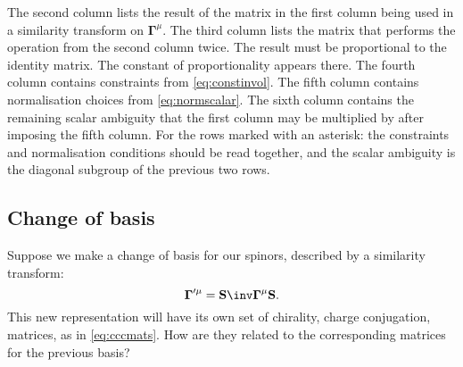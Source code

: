 \documentclass[11pt]{article}
\newcommand{\Gammab}{\boldsymbol{\Gamma}}
\renewcommand{\S}{\mathbf{S}}
\begin{document}
\begin{table}
{  The second column lists the result of the matrix in the first column being used in a similarity transform on $\Gammab^\mu$.
  The third column lists the matrix that performs the operation from the second column twice.
  The result must be proportional to the identity matrix. 
  The constant of proportionality appears there.
  The fourth column contains constraints from \cref{eq:constinvol}.
  The fifth column contains normalisation choices from \cref{eq:normscalar}.
  The sixth column contains the remaining scalar ambiguity that the first column may be multiplied by after imposing the fifth column.
  For the rows marked with an asterisk: the constraints and normalisation conditions should be read together, and the scalar ambiguity is the diagonal subgroup of the previous two rows.
  }\label{tab:exist}
\end{table}




\subsection{Change of basis}\label{sec:basis}

Suppose we make a change of basis for our spinors, described by a similarity transform:
%
\begin{equation*}
  \Gammab'^{\mu} = \S\inv \Gammab^\mu \S.
\end{equation*}
%
This new representation will have its own set of chirality, charge conjugation, \etc matrices, as in \cref{eq:cccmats}.
How are they related to the corresponding matrices for the previous basis?
\end{document}

